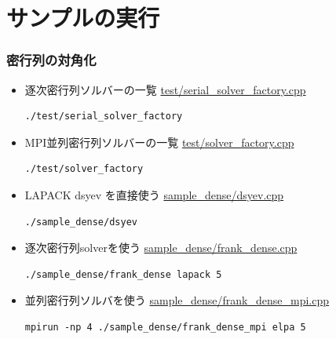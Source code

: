 \section{サンプルの実行}

\begin{frame}[c,fragile]
  \frametitle{密行列の対角化}
  \begin{itemize}
  \item 逐次密行列ソルバーの一覧 \href{https://github.com/t-sakashita/rokko/blob/master/test/serial_solver_factory.cpp}{test/serial\_solver\_factory.cpp}
\begin{lstlisting}[style=shstyle]
./test/serial_solver_factory
\end{lstlisting}
  \item MPI並列密行列ソルバーの一覧 \href{https://github.com/t-sakashita/rokko/blob/master/test/solver_factory.cpp}{test/solver\_factory.cpp}
\begin{lstlisting}[style=shstyle]
./test/solver_factory
\end{lstlisting}
  \item LAPACK dsyev を直接使う \href{https://github.com/t-sakashita/rokko/blob/master/sample_dense/dsyev.c}{sample\_dense/dsyev.cpp}
\begin{lstlisting}[style=shstyle]
./sample_dense/dsyev
\end{lstlisting}
  \item 逐次密行列solverを使う \href{https://github.com/t-sakashita/rokko/blob/master/sample_dense/frank_dense.cpp}{sample\_dense/frank\_dense.cpp}
\begin{lstlisting}[style=shstyle]
./sample_dense/frank_dense lapack 5
\end{lstlisting}
  \item 並列密行列ソルバを使う \href{https://github.com/t-sakashita/rokko/blob/master/sample_dense/frank_dense_mpi.cpp}{sample\_dense/frank\_dense\_mpi.cpp}
\begin{lstlisting}[style=shstyle]
mpirun -np 4 ./sample_dense/frank_dense_mpi elpa 5
\end{lstlisting}
  \end{itemize}
\end{frame}

